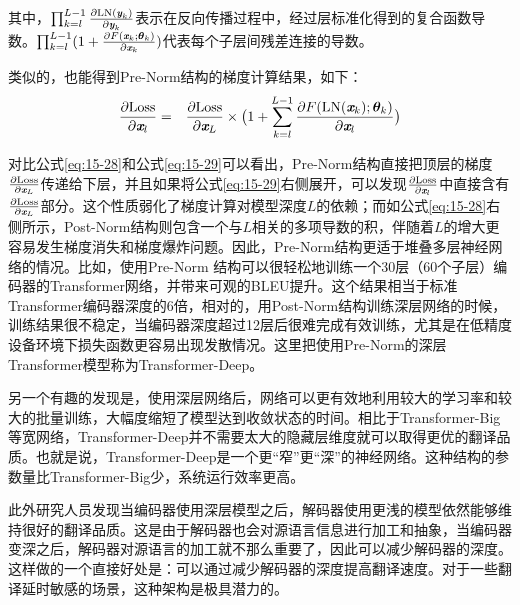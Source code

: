 \noindent 其中，$\prod_{k=l}^{L-1}\frac{\partial \textrm{LN}(\textbf{\em y}_k)}{\partial \textbf{\em y}_k}$表示在反向传播过程中，经过层标准化得到的复合函数导数。$\prod_{k=l}^{L-1}(1+\frac{\partial F(\textbf{\em x}_k;{\bm \theta_k})}{\partial \textbf{\em x}_k})$代表每个子层间残差连接的导数。

\parinterval 类似的，也能得到Pre-Norm结构的梯度计算结果，如下：
\begin{eqnarray}
\frac{\partial \textrm{Loss}}{\partial \textbf{\em x}_l} &=& \frac{\partial \textrm{Loss}}{\partial \textbf{\em x}_L} \times \big(1+\sum_{k=l}^{L-1}\frac{\partial F(\textrm{LN}(\textbf{\em x}_k);{\bm \theta_k})}{\partial \textbf{\em x}_l} \big)
\label{eq:15-29}
\end{eqnarray}

\parinterval 对比公式\eqref{eq:15-28}和公式\eqref{eq:15-29}可以看出，Pre-Norm结构直接把顶层的梯度$\frac{\partial \textrm{Loss}}{\partial \textbf{\em x}_L}$传递给下层，并且如果将公式\eqref{eq:15-29}右侧展开，可以发现$\frac{\partial \textrm{Loss}}{\partial \textbf{\em x}_l}$中直接含有$\frac{\partial \textrm{Loss}}{\partial \textbf{\em x}_L}$部分。这个性质弱化了梯度计算对模型深度$L$的依赖；而如公式\eqref{eq:15-28}右侧所示，Post-Norm结构则包含一个与$L$相关的多项导数的积，伴随着$L$的增大更容易发生梯度消失和梯度爆炸问题。因此，Pre-Norm结构更适于堆叠多层神经网络的情况。比如，使用Pre-Norm 结构可以很轻松地训练一个30层（60个子层）编码器的Transformer网络，并带来可观的BLEU提升。这个结果相当于标准Transformer编码器深度的6倍，相对的，用Post-Norm结构训练深层网络的时候，训练结果很不稳定，当编码器深度超过12层后很难完成有效训练，尤其是在低精度设备环境下损失函数更容易出现发散情况。这里把使用Pre-Norm的深层Transformer模型称为Transformer-Deep。

\parinterval 另一个有趣的发现是，使用深层网络后，网络可以更有效地利用较大的学习率和较大的批量训练，大幅度缩短了模型达到收敛状态的时间。相比于Transformer-Big等宽网络，Transformer-Deep并不需要太大的隐藏层维度就可以取得更优的翻译品质。也就是说，Transformer-Deep是一个更“窄”更“深”的神经网络。这种结构的参数量比Transformer-Big少，系统运行效率更高。

\parinterval 此外研究人员发现当编码器使用深层模型之后，解码器使用更浅的模型依然能够维持很好的翻译品质。这是由于解码器也会对源语言信息进行加工和抽象，当编码器变深之后，解码器对源语言的加工就不那么重要了，因此可以减少解码器的深度。这样做的一个直接好处是：可以通过减少解码器的深度提高翻译速度。对于一些翻译延时敏感的场景，这种架构是极具潜力的。

